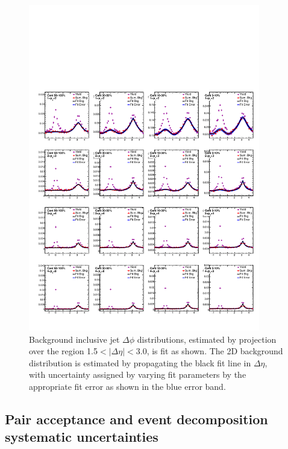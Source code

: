 \begin{figure}[h!]
\begin{center}
\includegraphics[width=0.9\textwidth]{figures/Appendices/Fits_PbPb_Inclusive.pdf}
\caption[Inclusive jet background fits]{Background inclusive jet $\Delta\phi$ distributions, estimated by projection over the region 1.5$<|\Delta\eta|<$3.0, is fit as shown.  The 2D background distribution is estimated by propagating the black fit line in $\Delta\eta$, with uncertainty assigned by varying fit parameters by the appropriate fit error as shown in the blue error band.}
\label{fig:inc_fit}
\end{center}
\end{figure}

\clearpage



\subsection{Pair acceptance and event decomposition systematic uncertainties}

